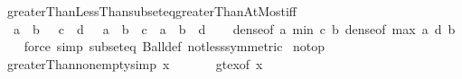 \begin{isabellebody}
\endisatagproof
{\isafoldproof}%
%
\isadelimproof
\isanewline
%
\endisadelimproof
\isanewline
{}\isamarkupfalse%
\ greaterThanLessThan{\isacharunderscore}{\kern0pt}subseteq{\isacharunderscore}{\kern0pt}greaterThanAtMost{\isacharunderscore}{\kern0pt}iff{\isacharcolon}{\kern0pt}\isanewline
\ \ {\isachardoublequoteopen}{\isacharbraceleft}{\kern0pt}a\ {\isacharless}{\kern0pt}{\isachardot}{\kern0pt}{\isachardot}{\kern0pt}{\isacharless}{\kern0pt}\ b{\isacharbraceright}{\kern0pt}\ {\isasymsubseteq}\ {\isacharbraceleft}{\kern0pt}\ c\ {\isacharless}{\kern0pt}{\isachardot}{\kern0pt}{\isachardot}{\kern0pt}\ d\ {\isacharbraceright}{\kern0pt}\ {\isasymlongleftrightarrow}\ {\isacharparenleft}{\kern0pt}a\ {\isacharless}{\kern0pt}\ b\ {\isasymlongrightarrow}\ c\ {\isasymle}\ a\ {\isasymand}\ b\ {\isasymle}\ d{\isacharparenright}{\kern0pt}{\isachardoublequoteclose}\isanewline
%
\isadelimproof
\ \ %
\endisadelimproof
%
\isatagproof
{}\isamarkupfalse%
\ dense{\isacharbrackleft}{\kern0pt}of\ {\isachardoublequoteopen}a{\isachardoublequoteclose}\ {\isachardoublequoteopen}min\ c\ b{\isachardoublequoteclose}{\isacharbrackright}{\kern0pt}\ dense{\isacharbrackleft}{\kern0pt}of\ {\isachardoublequoteopen}max\ a\ d{\isachardoublequoteclose}\ {\isachardoublequoteopen}b{\isachardoublequoteclose}{\isacharbrackright}{\kern0pt}\isanewline
\ \ \isamarkupfalse%
\ {\isacharparenleft}{\kern0pt}force\ simp{\isacharcolon}{\kern0pt}\ subset{\isacharunderscore}{\kern0pt}eq\ Ball{\isacharunderscore}{\kern0pt}def\ not{\isacharunderscore}{\kern0pt}less{\isacharbrackleft}{\kern0pt}symmetric{\isacharbrackright}{\kern0pt}{\isacharparenright}{\kern0pt}%
\endisatagproof
{\isafoldproof}%
%
\isadelimproof
\isanewline
%
\endisadelimproof
\isanewline
{}\isamarkupfalse%
\isanewline
\isanewline
{}\isamarkupfalse%
\ no{\isacharunderscore}{\kern0pt}top\isanewline
{}\isanewline
\isanewline
{}\isamarkupfalse%
\ greaterThan{\isacharunderscore}{\kern0pt}non{\isacharunderscore}{\kern0pt}empty{\isacharbrackleft}{\kern0pt}simp{\isacharbrackright}{\kern0pt}{\isacharcolon}{\kern0pt}\ {\isachardoublequoteopen}{\isacharbraceleft}{\kern0pt}x\ {\isacharless}{\kern0pt}{\isachardot}{\kern0pt}{\isachardot}{\kern0pt}{\isacharbraceright}{\kern0pt}\ {\isasymnoteq}\ {\isacharbraceleft}{\kern0pt}{\isacharbraceright}{\kern0pt}{\isachardoublequoteclose}\isanewline
%
\isadelimproof
\ \ %
\endisadelimproof
%
\isatagproof
{}\isamarkupfalse%
\ gt{\isacharunderscore}{\kern0pt}ex{\isacharbrackleft}{\kern0pt}of\ x{\isacharbrackright}{\kern0pt}\ \isamarkupfalse%

\end{isabellebody}
